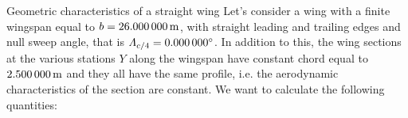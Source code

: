 \documentclass[[12pt,twoside]{book}
\begin{document}
\begin{myExampleX}{Geometric characteristics of a straight wing}{}%
\label{example:Geometric:Characteristics:Of:A:Straight:Wing}
%
\noindent
Let's consider a wing with a finite wingspan equal to $b=\SI[round-precision=0]{\mySpanWingMT}{\metre}$, with straight leading and trailing edges and null sweep angle, that is $\Lambda_{c/4}=\SI[round-precision=0]{\myLambdaCQuarter}{\degree}$.
In addition to this, the wing sections at the various stations $Y$ along the wingspan have constant chord equal to $\SI[round-precision=2]{\myChordRootWingMT}{\metre}$
and they all have the same profile, i.e. the aerodynamic characteristics of the section are constant. We want to calculate the following quantities:

\medskip


\end{myExampleX}
\end{document}
